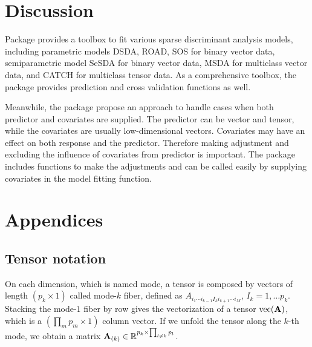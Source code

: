  \section{Discussion}
 
 Package  provides a toolbox to fit various sparse discriminant analysis models, including parametric models DSDA, ROAD, SOS for binary vector data, semiparametric model SeSDA for binary vector data, MSDA for multiclass vector data, and CATCH for multiclass tensor data. As a comprehensive toolbox, the package provides prediction and cross validation functions as well. 
 
 Meanwhile, the package propose an approach to handle cases when both predictor and covariates are supplied. The predictor can be vector and tensor, while the covariates are usually low-dimensional vectors. Covariates may have an effect on both response and the predictor. Therefore making adjustment and excluding the influence of covariates from predictor is important. The package includes functions to make the adjustments and can be called easily by supplying covariates in the model fitting function.
 
 \appendix
 \section{Appendices}\label{sec:appendix}
 \renewcommand{\thesubsection}{\Alph{subsection}}
 
 \subsection{Tensor notation} \label{Append.A}
 
 
 On each dimension, which is named mode, a tensor is composed by vectors of length $(p_k\times 1)$ called mode-$k$ fiber, defined as $A_{i_1\cdots i_{k-1}I_ki_{k+1}\cdots i_M}$, $I_k=1,\dots p_k$. Stacking the mode-$1$ fiber by row gives the vectorization of a tensor $\mathrm{vec}(\mathbf{A})$, which is a $(\prod_{m}p_m\times1)$ column vector. If we unfold the tensor along the $k$-th mode, we obtain a matrix $\mathbf{A}_{(k)}\in\mathbb{R}^{p_k\times \prod_{l\ne k}p_l}$. 
 
